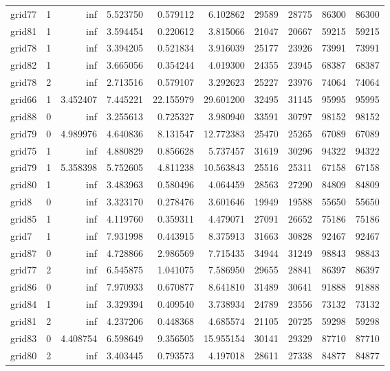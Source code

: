 \begin{longtable}{|l|r|r|r|r|r|r|r|r|r|}
grid77 & 1 & inf & 5.523750 & 0.579112 & 6.102862 & 29589 & 28775 & 86300 & 86300 \\
grid81 & 1 & inf & 3.594454 & 0.220612 & 3.815066 & 21047 & 20667 & 59215 & 59215 \\
grid78 & 1 & inf & 3.394205 & 0.521834 & 3.916039 & 25177 & 23926 & 73991 & 73991 \\
grid82 & 1 & inf & 3.665056 & 0.354244 & 4.019300 & 24355 & 23945 & 68387 & 68387 \\
grid78 & 2 & inf & 2.713516 & 0.579107 & 3.292623 & 25227 & 23976 & 74064 & 74064 \\
grid66 & 1 & 3.452407 & 7.445221 & 22.155979 & 29.601200 & 32495 & 31145 & 95995 & 95995 \\
grid88 & 0 & inf & 3.255613 & 0.725327 & 3.980940 & 33591 & 30797 & 98152 & 98152 \\
grid79 & 0 & 4.989976 & 4.640836 & 8.131547 & 12.772383 & 25470 & 25265 & 67089 & 67089 \\
grid75 & 1 & inf & 4.880829 & 0.856628 & 5.737457 & 31619 & 30296 & 94322 & 94322 \\
grid79 & 1 & 5.358398 & 5.752605 & 4.811238 & 10.563843 & 25516 & 25311 & 67158 & 67158 \\
grid80 & 1 & inf & 3.483963 & 0.580496 & 4.064459 & 28563 & 27290 & 84809 & 84809 \\
grid8 & 0 & inf & 3.323170 & 0.278476 & 3.601646 & 19949 & 19588 & 55650 & 55650 \\
grid85 & 1 & inf & 4.119760 & 0.359311 & 4.479071 & 27091 & 26652 & 75186 & 75186 \\
grid7 & 1 & inf & 7.931998 & 0.443915 & 8.375913 & 31663 & 30828 & 92467 & 92467 \\
grid87 & 0 & inf & 4.728866 & 2.986569 & 7.715435 & 34944 & 31249 & 98843 & 98843 \\
grid77 & 2 & inf & 6.545875 & 1.041075 & 7.586950 & 29655 & 28841 & 86397 & 86397 \\
grid86 & 0 & inf & 7.970933 & 0.670877 & 8.641810 & 31489 & 30641 & 91888 & 91888 \\
grid84 & 1 & inf & 3.329394 & 0.409540 & 3.738934 & 24789 & 23556 & 73132 & 73132 \\
grid81 & 2 & inf & 4.237206 & 0.448368 & 4.685574 & 21105 & 20725 & 59298 & 59298 \\
grid83 & 0 & 4.408754 & 6.598649 & 9.356505 & 15.955154 & 30141 & 29329 & 87710 & 87710 \\
grid80 & 2 & inf & 3.403445 & 0.793573 & 4.197018 & 28611 & 27338 & 84877 & 84877 \\

\end{longtable}
